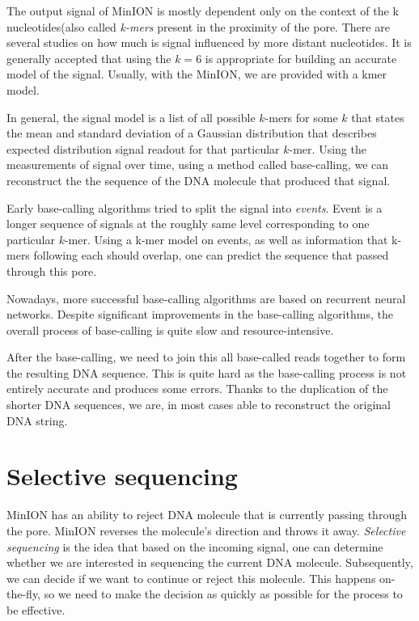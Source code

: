 The output signal of MinION is mostly dependent only on the context of the k
nucleotides(also called \textit{k-mers} present in the proximity of the pore. There are several studies on
how much is signal influenced by more distant nucleotides. It is generally accepted
that using the $k = 6$ is appropriate for building an accurate model of the signal. 
Usually, with the MinION, we are provided with a kmer model.

In general, the signal model is a list of all possible $k$-mers for some $k$
that states the mean and standard deviation of a Gaussian distribution that
describes expected distribution signal readout for that particular $k$-mer.
Using the measurements of signal over time, using a method called base-calling, we can reconstruct the
the sequence of the DNA molecule that produced that signal.

Early base-calling algorithms tried to split the signal into \textit{events}\cite{david2017nanocall}.
Event is a longer sequence of signals at the roughly same level corresponding
to one particular $k$-mer. Using a k-mer model on events, as well as information
that k-mers following each should overlap, one can predict the sequence that passed through this pore.

Nowadays, more successful base-calling algorithms are based on recurrent neural
networks. Despite significant improvements in the base-calling algorithms, the overall
process of base-calling is quite slow and resource-intensive.

After the base-calling, we need to join this all base-called reads together to form the
resulting DNA sequence. This is quite hard as the base-calling process is not entirely
accurate and produces some errors. Thanks to the duplication of the shorter DNA
sequences, we are, in most cases able to reconstruct the original DNA string.

\section{Selective sequencing}

MinION has an ability to reject DNA molecule that is currently passing through
the pore. MinION reverses the molecule's direction and throws it away.
\textit{Selective sequencing} is the idea that based on the incoming signal, one can determine
whether we are interested in sequencing the current DNA molecule. Subsequently, we can decide if we want
to continue or reject this molecule. This happens on-the-fly, so we need to make
the decision as quickly as possible for the process to be effective.

